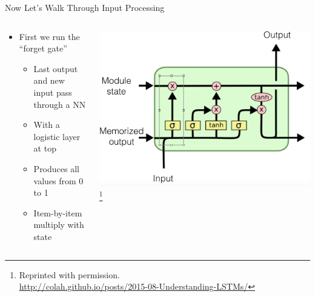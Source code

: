 \documentclass[aspectratio=169]{beamer}
\begin{document}
\begin{frame}{Now Let's Walk Through Input Processing}

\begin{columns}
\begin{column}{0.5\textwidth}
\begin{itemize}
	\item First we run the ``forget gate''
	\begin{itemize}
		\item Last output and new input pass through a NN
		\item With a logistic layer at top
		\item Produces all values from 0 to 1
		\item Item-by-item multiply with state
	\end{itemize}
\end{itemize}
\end{column}
\begin{column}{0.5\textwidth}
\includegraphics[width=1\textwidth]{lectLSTM/dampen.png}
\footnote{Reprinted with permission.\\ \hspace{1.7em}\url{http://colah.github.io/posts/2015-08-Understanding-LSTMs/}}
\end{column}
\end{columns}
\end{frame}
\end{document}
